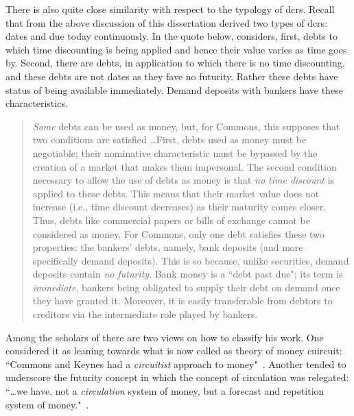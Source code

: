 There is also quite close similarity with respect to the typology of \acfp{dcr}. Recall that from the above discussion of \citeauthor{innes1913} this dissertation derived two types of \acp{dcr}: dates and due today continuously. In the quote below, \citeauthor{commons1951} considers, first, debts to which time discounting is being applied and hence their value varies as time goes by. Second, there are debts, in application to which there is no time discounting, and these debts are not dates as they fave no futurity. Rather these debts have status of being available immediately. Demand deposits with bankers have these characteristics.

\begin{quote}
\textit{Some} debts can be used as money, but, for Commons, this supposes that two conditions are satisfied \dots First, debts used as money must be negotiable; their nominative characteristic must be bypassed by the creation of a market that makes them impersonal. The second condition necessary to allow the use of debts as money is that \textit{no time discount} is applied to these debts. This means that their market value does not increase (i.e., time discount decreases) as their maturity comes closer. Thus, debts like commercial papers or bills of exchange cannot be considered as money. For Commons, only one debt satisfies these two properties: the bankers' debts, namely, bank deposits (and more specifically demand deposits). This is so because, unlike securities, demand deposits contain \textit{no futurity}. Bank money is a ``debt past due"; its term is \textit{immediate}, bankers being obligated to supply their debt on demand once they have granted it. Moreover, it is easily transferable from debtors to creditors via the  intermediate role played by bankers. \citep[p.~529, emphasis added]{tymoigne2003}
\end{quote}

Among the scholars of \citeauthor{commons1951} there are two views on how to classify his work. One considered it as leaning towards what is now called as theory of money cuircuit: ``Commons and Keynes had a \textit{circuitist} approach to money"~\citep[p.~528, emphasis added]{tymoigne2003}. Another tended to underscore the futurity concept in which the concept of circulation was relegated: ``\dots we have, not a \textit{circulation} system of money, but a forecast and repetition system of money."~\citep[Commons quoted in][p.~11161, emphasis original]{whalen1993}.

%
%
